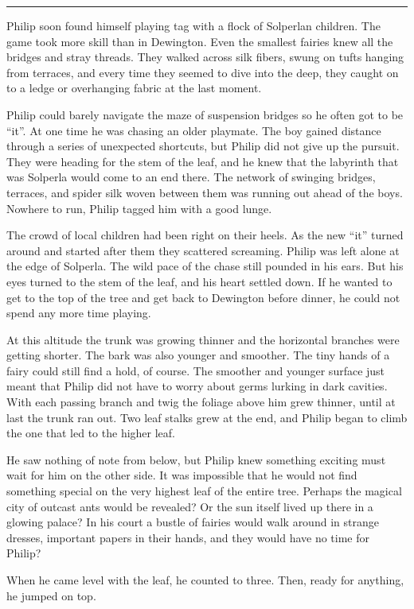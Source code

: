 \documentclass[10pt, draft]{memoir}
\renewcommand{\pfbreakdisplay}{\bigskip \ding{166} \bigskip}
\newcommand{\secbreak}{\fancybreak{\pfbreakdisplay}}
\begin{document}
\secbreak

Philip soon found himself playing tag with a flock of Solperlan children. The
game took more skill than in Dewington. Even the smallest fairies knew all the
bridges and stray threads. They walked across silk fibers, swung on tufts
hanging from terraces, and every time they seemed to dive into the deep, they
caught on to a ledge or overhanging fabric at the last moment.

Philip could barely navigate the maze of suspension bridges so he often got to
be ``it''. At one time he was chasing an older playmate. The boy gained
distance through a series of unexpected shortcuts, but Philip did not give up
the pursuit. They were heading for the stem of the leaf, and he knew that the
labyrinth that was Solperla would come to an end there. The network of swinging
bridges, terraces, and spider silk woven between them was running out ahead of
the boys. Nowhere to run, Philip tagged him with a good lunge.

The crowd of local children had been right on their heels. As the new ``it''
turned around and started after them they scattered screaming.  Philip was left
alone at the edge of Solperla. The wild pace of the chase still pounded in his
ears. But his eyes turned to the stem of the leaf, and his heart settled down.
If he wanted to get to the top of the tree and get back to Dewington before
dinner, he could not spend any more time playing.

At this altitude the trunk was growing thinner and the horizontal branches were
getting shorter. The bark was also younger and smoother. The tiny hands of a
fairy could still find a hold, of course. The smoother and younger surface just
meant that Philip did not have to worry about germs lurking in dark cavities.
With each passing branch and twig the foliage above him grew thinner, until at
last the trunk ran out. Two leaf stalks grew at the end, and Philip began to
climb the one that led to the higher leaf.

He saw nothing of note from below, but Philip knew something exciting must wait
for him on the other side. It was impossible that he would not find something
special on the very highest leaf of the entire tree. Perhaps the magical city
of outcast ants would be revealed? Or the sun itself lived up there in a
glowing palace? In his court a bustle of fairies would walk around in strange
dresses, important papers in their hands, and they would have no time for
Philip?

When he came level with the leaf, he counted to three. Then, ready for
anything, he jumped on top.
\end{document}
